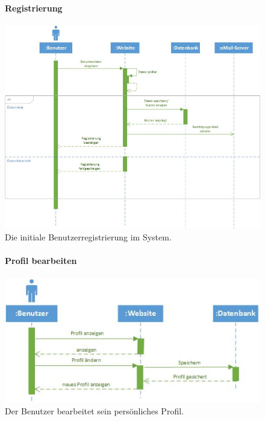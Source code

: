\documentclass[12pt,a4paper]{article}
\begin{document}
\begin{figure}[H]
	\centering
	\paragraph{Registrierung}
	\includegraphics[width=\textwidth]{Bilder/Sequenzdiagramme/Registrierung1.jpg}
	\caption{Die initiale Benutzerregistrierung im System.}
	\label{SzRegistrieren}
\end{figure}
\begin{figure}[H]
	\centering
	\paragraph{Profil bearbeiten}
	\includegraphics[width=\textwidth]{Bilder/Sequenzdiagramme/ProfilBearbeiten1.jpg}
	\caption{Der Benutzer bearbeitet sein persönliches Profil.}
	\label{SzProfilBearbeiten}
\end{figure}
\end{document}

